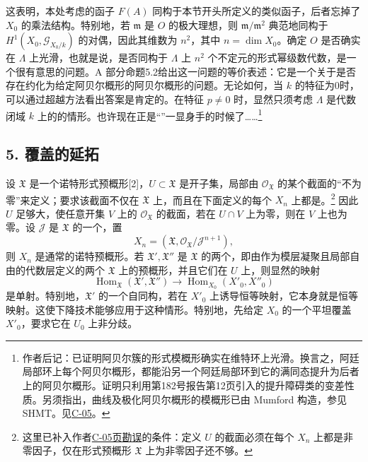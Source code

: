 这表明，本处考虑的函子 $F(A)$ 同构于本节开头所定义的类似函子，后者忘掉了 $X_0$ 的乘法结构。特别地，若 $\mathfrak m$ 是 $O$ 的极大理想，则 $\mathfrak m/\mathfrak m^2$ 典范地同构于 $H^1(X_0,\mathcal G_{X_0/k})$ 的对偶，因此其维数为 $n^2$，其中 $n=\dim X_0$。确定 $O$ 是否确实在 $\Lambda$ 上光滑，也就是说，是否同构于 $\Lambda$ 上 $n^2$ 个不定元的形式幂级数代数，是一个很有意思的问题。A 部分命题5.2给出这一问题的等价表述：它是一个关于是否存在约化为给定阿贝尔概形的阿贝尔概形的问题。无论如何，当 $k$ 的特征为0时，可以通过超越方法看出答案是肯定的。在特征 $p\ne0$ 时，显然只须考虑 $\Lambda$ 是代数闭域 $k$ 上的的情形。也许现在正是“”一显身手的时候了……\footnote{作者后记：已证明阿贝尔簇的形式模概形确实在维特环上光滑。换言之，阿廷局部环上每个阿贝尔概形，都能沿另一个阿廷局部环到它的满同态提升为后者上的阿贝尔概形。证明只利用第182号报告第12页引入的提升障碍类的变差性质。另须指出，曲线及极化阿贝尔概形的模概形已由 Mumford 构造，参见 SHMT。见\hyperref[orig:7]{C-05}。}

\subsection*{5. 覆盖的延拓}
设 $\mathfrak X$ 是一个诺特形式预概形[2]，$U\subset\mathfrak X$ 是开子集，局部由 $\mathcal O_{\mathfrak X}$ 的某个截面的“不为零”来定义；要求该截面不仅在 $\mathfrak X$ 上，而且在下面定义的每个 $X_n$ 上都是。\footnote{这里已补入作者\hyperref[orig:7]{C-05页勘误}的条件：定义 $U$ 的截面必须在每个 $X_n$ 上都是非零因子，仅在形式预概形 $\mathfrak X$ 上为非零因子还不够。}
因此 $U$ 足够大，使任意开集 $V$ 上的 $\mathcal O_{\mathfrak X}$ 的截面，若在 $U\cap V$ 上为零，则在 $V$ 上也为零。设 $\mathcal J$ 是 $\mathfrak X$ 的一个，置
\[
 X_n=(\mathfrak X,\mathcal O_{\mathfrak X}/\mathcal J^{n+1}),
\]
则 $X_n$ 是通常的诺特预概形。若 $\mathfrak X',\mathfrak X''$ 是 $\mathfrak X$ 的两个，即由作为模层凝聚且局部自由的代数层定义的两个 $\mathfrak X$ 上的预概形，并且它们在 $U$ 上，则显然的映射
\[
 \operatorname{Hom}_{\mathfrak X}(\mathfrak X',\mathfrak X'')
 \longrightarrow\operatorname{Hom}_{X_0}(X'_0,X''_0)
\]
是单射。特别地，$\mathfrak X'$ 的一个自同构，若在 $X'_0$ 上诱导恒等映射，它本身就是恒等映射。这使下降技术能够应用于这种情形。特别地，先给定 $X_0$ 的一个平坦覆盖 $X'_0$，要求它在 $U_0$ 上非分歧。

